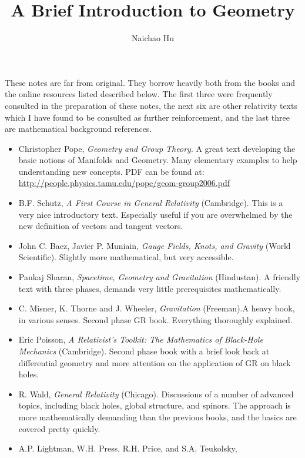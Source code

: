 \documentclass[a4paper,11pt]{article}
\title{\boldmath A Brief Introduction to Geometry}
\author{Naichao Hu}
\affiliation{Department of Physics,\\Sun Yat-sen University}
\begin{document}
 
\maketitle
\flushbottom


\clearpage

\acknowledgments
These notes are far from original. They borrow heavily both from the books 
and the online resources listed described below. 
The first three were frequently consulted in the preparation of these
notes, the next six are other relativity texts which I have found to
be consulted as further reinforcement, and the last three 
are mathematical background references.
\begin{itemize}
\item Christopher Pope, \textit{Geometry and Group Theory}. A great
  text developing the basic notions of Manifolds and Geometry. Many
  elementary examples to help understanding new concepts. PDF can be
  found at:
  \url{http://people.physics.tamu.edu/pope/geom-group2006.pdf}
\item B.F. Schutz, \textit{A First Course in General Relativity}
  (Cambridge). This is a very nice introductory text. Especially
  useful if you are overwhelmed by the new definition of vectors and
  tangent vectors.
\item John C. Baez, Javier P. Muniain, \textit{Gauge Fields, Knots,
    and Gravity} (World Scientific). Slightly more mathematical, but
  very accessible.
\item Pankaj Sharan, \textit{Spacetime, Geometry and Gravitation}
  (Hindustan). A friendly text with three phases, demands very little
  prerequisites mathematically.
\item C. Misner, K. Thorne and J. Wheeler, \textit{Gravitation}
  (Freeman).A heavy book, in various senses. Second phase GR
  book. Everything thoroughly explained.
\item Eric Poisson, \textit{A Relativist's Toolkit: The Mathematics of
    Black-Hole Mechanics} (Cambridge). Second phase book with a brief
  look back at differential geometry and more attention on the
  application of GR on black holes.
\item R. Wald, \textit{General Relativity} (Chicago). Discussions of a
  number of advanced topics, including black holes, global structure,
  and spinors. The approach is more mathematically demanding than the
  previous books, and the basics are covered pretty quickly.
\item A.P. Lightman, W.H. Press, R.H. Price, and S.A. Teukolsky,

\end{itemize}
\end{document}
